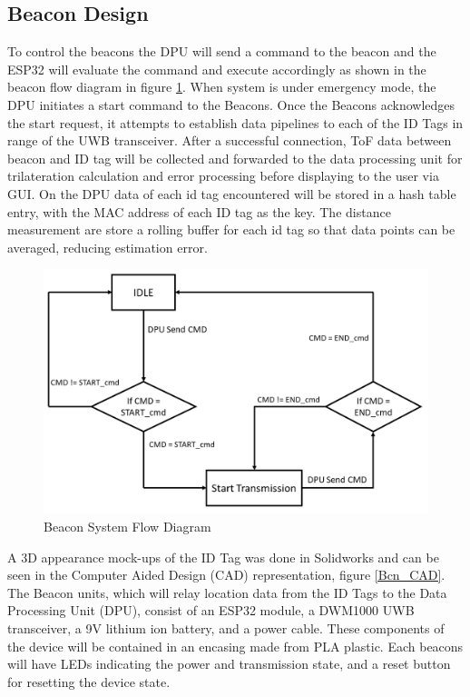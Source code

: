 \subsection{Beacon Design}
\medskip
To control the beacons the DPU will send a command to the beacon and the ESP32 will evaluate the command and execute accordingly as shown in the beacon flow diagram in figure \ref{bcn_flow}. When system is under emergency mode, the DPU initiates a start command to the Beacons. Once the Beacons acknowledges the start request, it attempts to establish data pipelines to each of the ID Tags in range of the UWB transceiver. After a successful connection, ToF data between beacon and ID tag will be collected and forwarded to the data processing unit for trilateration calculation and error processing before displaying to the user via GUI. On the DPU data of each id tag encountered will be stored in a hash table entry, with the \Gls{MAC} address of each ID tag as the key. The distance measurement are store a rolling buffer for each id tag so that data points can be averaged, reducing estimation error.\\

\bigskip
\begin{figure}[H]
\centering
    \includegraphics[width=\linewidth]{./images/beacon_flow.png}
    \caption{Beacon System Flow Diagram}
    \label{bcn_flow}
\end{figure}
\medskip

\pagebreak
A 3D appearance mock-ups of the ID Tag was done in Solidworks and can be seen in the Computer Aided Design (CAD) representation, figure \ref{Bcn_CAD}. The Beacon units, which will relay location data from the ID Tags to the Data Processing Unit (DPU), consist of an ESP32 module, a DWM1000 UWB transceiver, a 9V lithium ion battery, and a power cable. These components of the device will be contained in an encasing made from \Gls{PLA} plastic. Each beacons will have LEDs indicating the power and transmission state, and a reset button for resetting the device state. 

